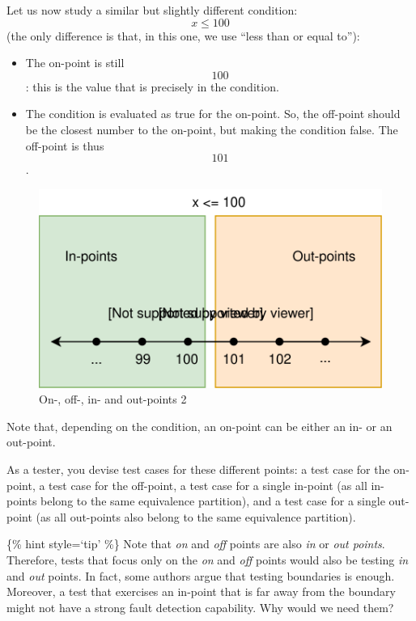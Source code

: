 Let us now study a similar but slightly different condition:
\[x \leq 100\] (the only difference is that, in this one, we use ``less
than or equal to''):

\begin{itemize}
\tightlist
\item
  The on-point is still \[100\]: this is the value that is precisely in
  the condition.
\item
  The condition is evaluated as true for the on-point. So, the off-point
  should be the closest number to the on-point, but making the condition
  false. The off-point is thus \[101\].
\end{itemize}

\begin{figure}
\centering
\includegraphics{img/boundary-testing/examples/on_off_points2.svg}
\caption{On-, off-, in- and out-points 2}
\end{figure}

Note that, depending on the condition, an on-point can be either an in-
or an out-point.

As a tester, you devise test cases for these different points: a test
case for the on-point, a test case for the off-point, a test case for a
single in-point (as all in-points belong to the same equivalence
partition), and a test case for a single out-point (as all out-points
also belong to the same equivalence partition).

\{\% hint style=`tip' \%\} Note that \emph{on} and \emph{off} points are
also \emph{in} or \emph{out points}. Therefore, tests that focus only on
the \emph{on} and \emph{off} points would also be testing \emph{in} and
\emph{out} points. In fact, some authors argue that testing boundaries
is enough. Moreover, a test that exercises an in-point that is far away
from the boundary might not have a strong fault detection capability.
Why would we need them?

